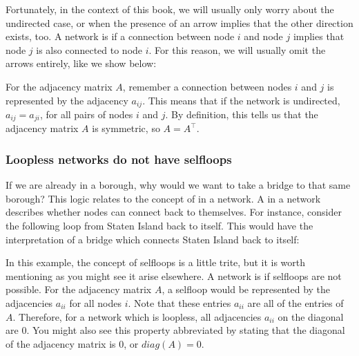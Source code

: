 \documentclass[letterpaper,10pt,english]{jupyterBook}
\begin{document}
\noindent{}

\sphinxAtStartPar
Fortunately, in the context of this book, we will usually only worry about the undirected case, or when the presence of an arrow implies that the other direction exists, too. A network is  if a connection between node \(i\) and node \(j\) implies that node \(j\) is also connected to node \(i\). For this reason, we will usually omit the arrows entirely, like we show below:

\noindent{}

\sphinxAtStartPar
For the adjacency matrix \(A\), remember a connection between nodes \(i\) and \(j\) is represented by the adjacency \(a_{ij}\). This means that if the network is undirected, \(a_{ij} = a_{ji}\), for all pairs of nodes \(i\) and \(j\). By definition, this tells us that the adjacency matrix \(A\) is symmetric, so \(A = A^\top\).


\subsubsection{Loopless networks do not have self\sphinxhyphen{}loops}
\label{\detokenize{representations/ch4/properties-of-networks:loopless-networks-do-not-have-self-loops}}
\sphinxAtStartPar
If we are already in a borough, why would we want to take a bridge to that same borough? This logic relates to the concept of  in a network. A  in a network describes whether nodes can connect back to themselves. For instance, consider the following loop from Staten Island back to itself. This would have the interpretation of a bridge which connects Staten Island back to itself:

\noindent{}

\sphinxAtStartPar
In this example, the concept of self\sphinxhyphen{}loops is a little trite, but it is worth mentioning as you might see it arise elsewhere. A network is  if self\sphinxhyphen{}loops are not possible. For the adjacency matrix \(A\), a self\sphinxhyphen{}loop would be represented by the adjacencies \(a_{ii}\) for all nodes \(i\). Note that these entries \(a_{ii}\) are all of the  entries of \(A\). Therefore, for a network which is loopless, all adjacencies \(a_{ii}\) on the diagonal are \(0\). You might also see this property abbreviated by stating that the diagonal of the adjacency matrix is \(0\), or \(diag(A) = 0\).
\end{document}

